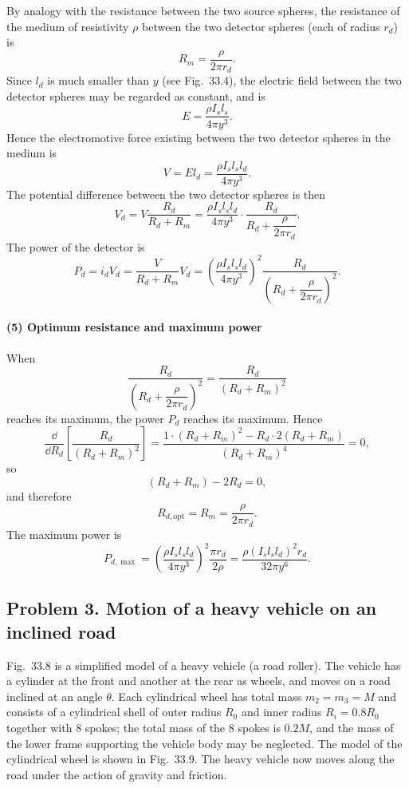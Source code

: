 By analogy with the resistance between the two source spheres, the resistance of the medium of resistivity $\rho$ between the two detector spheres (each of radius $r_d$) is
\[
R_m=\frac{\rho}{2\pi r_d}.
\]
Since $l_d$ is much smaller than $y$ (see Fig.~33.4), the electric field between the two detector spheres may be regarded as constant, and is
\[
E=\frac{\rho I_s l_s}{4\pi y^3}.
\]
Hence the electromotive force existing between the two detector spheres in the medium is
\[
V=El_d=\frac{\rho I_s l_s l_d}{4\pi y^3}.
\]
The potential difference between the two detector spheres is then
\[
V_d=V\frac{R_d}{R_d+R_m}
=\frac{\rho I_s l_s l_d}{4\pi y^3}\cdot\frac{R_d}{R_d+\dfrac{\rho}{2\pi r_d}}.
\]
The power of the detector is
\[
P_d=i_dV_d=\frac{V}{R_d+R_m}V_d
=\left(\frac{\rho I_s l_s l_d}{4\pi y^3}\right)^2
\frac{R_d}{\left(R_d+\dfrac{\rho}{2\pi r_d}\right)^2}.
\]

\paragraph{(5) Optimum resistance and maximum power}

When
\[
\frac{R_d}{\left(R_d+\dfrac{\rho}{2\pi r_d}\right)^2}
=\frac{R_d}{(R_d+R_m)^2}
\]
reaches its maximum, the power $P_d$ reaches its maximum. Hence
\[
\frac{\dd}{\dd R_d}\left[\frac{R_d}{(R_d+R_m)^2}\right]
=\frac{1\cdot(R_d+R_m)^2-R_d\cdot2(R_d+R_m)}{(R_d+R_m)^4}=0,
\]
so
\[
(R_d+R_m)-2R_d=0,
\]
and therefore
\[
R_{d,\text{opt}}=R_m=\frac{\rho}{2\pi r_d}.
\]
The maximum power is
\[
P_{d,\max}=\left(\frac{\rho I_s l_s l_d}{4\pi y^3}\right)^2\frac{\pi r_d}{2\rho}
=\frac{\rho(I_s l_s l_d)^2r_d}{32\pi y^6}.
\]

\subsection*{Problem 3. Motion of a heavy vehicle on an inclined road}

Fig.~33.8 is a simplified model of a heavy vehicle (a road roller). The vehicle has a cylinder at the front and another at the rear as wheels, and moves on a road inclined at an angle $\theta$. Each cylindrical wheel has total mass $m_2=m_3=M$ and consists of a cylindrical shell of outer radius $R_0$ and inner radius $R_i=0.8R_0$ together with 8 spokes; the total mass of the 8 spokes is $0.2M$, and the mass of the lower frame supporting the vehicle body may be neglected. The model of the cylindrical wheel is shown in Fig.~33.9. The heavy vehicle now moves along the road under the action of gravity and friction.

